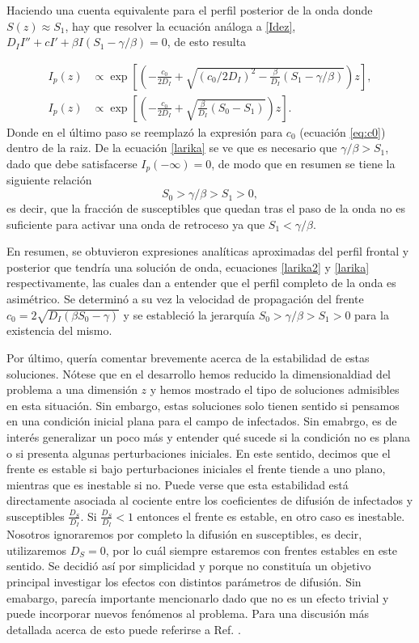 Haciendo una cuenta equivalente para el perfil posterior de la onda donde $S(z)\approx S_1$, hay que resolver la ecuación análoga a \ref{Idez}, 
$D_I I'' + cI'+\beta I(S_1-\gamma/\beta)=0$, de esto resulta 

\begin{align}
  I_p(z)&\propto \exp[\left(-\frac{c_0}{2D_I}+\sqrt{(c_0/2D_I)^2-\frac{\beta}{D_I}(S_1-\gamma/\beta)}\right)z], \label{larika} \\[.3cm]
  I_p(z)&\propto \exp[\left(-\frac{c_0}{2D_I}+ \sqrt{\frac{\beta}{D_I}(S_0-S_1)}\right)z].
\end{align}
Donde en el último paso se reemplazó la expresión para $c_0$ (ecuación \ref{eq:c0}) dentro de la raiz. De la ecuación \ref{larika} se ve que es necesario que $\gamma/\beta>S_1$, dado que debe satisfacerse $I_p(-\infty) = 0$, de modo que en resumen se tiene la siguiente relación
\[S_0>\gamma/\beta>S_1>0,\]
es decir, que la fracción de susceptibles que quedan tras el paso de la onda no es suficiente para activar una onda de retroceso ya que $S_1<\gamma/\beta$.

En resumen, se obtuvieron expresiones analíticas aproximadas del perfil frontal y posterior que tendría una solución de onda, ecuaciones \ref{larika2} 
y \ref{larika} respectivamente, las cuales dan a entender que el perfil completo de la onda es asimétrico. Se determinó a su vez la velocidad de propagación del frente 
$c_0=2\sqrt{D_I(\beta S_0-\gamma)}$ y se estableció la jerarquía $S_0>\gamma/\beta>S_1>0$ para la existencia del mismo.

Por último, quería comentar brevemente acerca de la estabilidad de estas soluciones. Nótese que en el desarrollo hemos reducido la dimensionaldiad del problema a una dimensión $z$ y hemos mostrado el tipo de soluciones admisibles en esta situación. Sin embargo, estas soluciones solo tienen sentido si pensamos en una condición inicial plana para el campo de infectados. Sin emabrgo, es de interés generalizar un poco más y entender qué sucede si la condición no es plana o si presenta algunas perturbaciones iniciales. En este sentido, decimos que el frente es estable si bajo perturbaciones iniciales el frente tiende a uno plano, mientras que es inestable si no. Puede verse que esta estabilidad está directamente asociada al cociente entre los coeficientes de difusión de infectados y susceptibles $\frac{D_S}{D_I}$. Si $\frac{D_S}{D_I}<1$ entonces el frente es estable, en otro caso es inestable. Nosotros ignoraremos por completo la difusión en susceptibles, es decir, utilizaremos $D_S=0$, por lo cuál siempre estaremos con frentes estables en este sentido. Se decidió así por simplicidad y porque no constituía un objetivo principal investigar los efectos con distintos parámetros de difusión. Sin emabargo, parecía importante mencionarlo dado que no es un efecto trivial y puede incorporar nuevos fenómenos al problema. Para una discusión más detallada acerca de esto puede referirse a Ref. \cite{horvath1993instabilities}.


